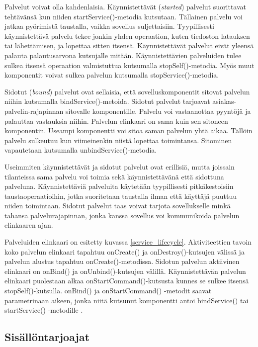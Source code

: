 Palvelut voivat olla kahdenlaisia. Käynnistettävät (\emph{started}) palvelut suorittavat tehtävänsä kun niiden startService()-metodia kutsutaan. Tällainen palvelu voi jatkaa pyörimistä taustalla, vaikka sovellus suljettaisiin. Tyypillisesti käynnistettävä palvelu tekee jonkin yhden operaation, kuten tiedoston latauksen tai lähettämisen, ja lopettaa sitten itsensä. Käynnistettävät palvelut eivät yleensä palauta palautusarvona kutsujalle mitään. Käynnistettävien palveluiden tulee sulkea itsensä operaation valmistuttua kutsumalla stopSelf()-metodia. Myös muut komponentit voivat sulkea palvelun kutsumalla stopService()-metodia.

Sidotut (\emph{bound}) palvelut ovat sellaisia, että sovelluskomponentit sitovat palvelun niihin kutsumalla bindService()-metoida. Sidotut palvelut tarjoavat asiakas-palvelin-rajapinnan sitovalle komponentille. Palvelu voi vastaanottaa pyyntöjä ja palauttaa vastauksia niihin. Palvelun elinkaari on sama kuin sen sitoneen komponentin. Useampi komponentti voi sitoa saman palvelun yhtä aikaa. Tällöin palvelu sulkeutuu kun viimeinenkin niistä lopettaa toimintansa. Sitominen vapautetaan kutsumalla unbindService()-metodia.

Useimmiten käynnistettävät ja sidotut palvelut ovat erillisiä, mutta joissain tilanteissa sama palvelu voi toimia sekä käynnistettävänä että sidottuna palveluna. Käynnistettäviä palveluita käytetään tyypillisesti pitkäkestoisiin taustaoperaatioihin, jotka suoritetaan taustalla ilman että käyttäjä puuttuu niiden toimintaan. Sidotut palvelut taas voivat tarjota sovellukselle minkä tahansa palvelurajapinnan, jonka kanssa sovellus voi kommunikoida palvelun elinkaaren ajan.

Palveluiden elinkaari on esitetty kuvassa \ref{service_lifecycle}. Aktiviteettien tavoin koko palvelun elinkaari tapahtuu onCreate() ja onDestroy()-kutsujen välissä ja palvelun alustus tapahtuu onCreate()-metodissa. Sidotun palvelun aktiivinen elinkaari on onBind() ja onUnbind()-kutsujen välillä. Käynnistettävän palvelun elinkaari puolestaan alkaa onStartCommand()-kutsusta kunnes se sulkee itsensä stopSelf()-kutsulla. onBind() ja onStartCommand() -metodit saavat parametrinaan aikeen, jonka niitä kutsunut komponentti antoi bindService() tai startService() -metodille \cite{android}.

\subsection{Sisällöntarjoajat}

